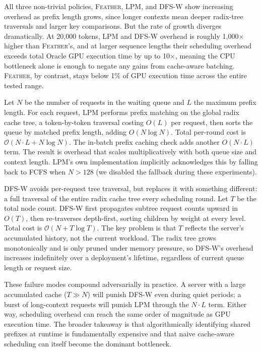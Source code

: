 All three non-trivial policies, \textsc{Feather}, LPM, and DFS-W show increasing overhead as prefix length grows, since longer contexts mean deeper radix-tree traversals and larger key comparisons. But the rate of growth diverges dramatically. At 20,000 tokens, LPM and DFS-W overhead is roughly 1,000$\times$ higher than \textsc{Feather}'s, and at larger sequence lengths their scheduling overhead exceeds total Oracle GPU execution time by up to 10$\times$, meaning the CPU bottleneck alone is enough to negate any gains from cache-aware batching. \textsc{Feather}, by contrast, stays below 1\% of GPU execution time across the entire tested range.

Let $N$ be the number of requests in the waiting queue and $L$ the maximum prefix length. For each request, LPM performs prefix matching on the global radix cache tree, a token-by-token traversal costing $O(L)$ per request, then sorts the queue by matched prefix length, adding $O(N \log N)$. Total per-round cost is $\mathcal{O}(N \cdot L + N \log N)$. The in-batch prefix caching check adds another $O(N \cdot L)$ term. The result is overhead that scales multiplicatively with both queue size and context length. LPM's own implementation implicitly acknowledges this by falling back to FCFS when $N > 128$ (we disabled the fallback during these experiments). 

DFS-W avoids per-request tree traversal, but replaces it with something different: a full traversal of the entire radix cache tree every scheduling round. Let $T$ be the total node count. DFS-W first propagates subtree request counts upward in $O(T)$, then re-traverses depth-first, sorting children by weight at every level. Total cost is $\mathcal{O}(N + T \log T)$. The key problem is that $T$ reflects the server's accumulated history, not the current workload. The radix tree grows monotonically and is only pruned under memory pressure, so DFS-W's overhead increases indefinitely over a deployment's lifetime, regardless of current queue length or request size.

These failure modes compound adversarially in practice. A server with a large accumulated cache ($T \gg N$) will punish DFS-W even during quiet periods; a burst of long-context requests will punish LPM through the $N \cdot L$ term. Either way, scheduling overhead can reach the same order of magnitude as GPU execution time. The broader takeaway is that algorithmically identifying shared prefixes at runtime is fundamentally expensive and that naive cache-aware scheduling can itself become the dominant bottleneck.

